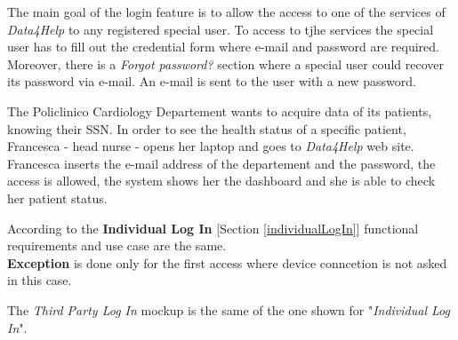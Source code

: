 The main goal of the login feature is to allow the access to one of the services of \textit{Data4Help} to any registered special user. To access to tjhe services the special user has to fill out the credential form where e-mail and password are required. Moreover, there is a \textit{Forgot password?} section where a special user could recover its password via e-mail. An e-mail is sent to the user with a new password.

The Policlinico Cardiology Departement wants to acquire data of its patients, knowing their SSN.
In order to see the health status of a specific patient, Francesca - head nurse - opens her laptop and goes to \textit{Data4Help} web site.
Francesca inserts the e-mail address of the departement and the password, the access is allowed, the system shows her the dashboard and she is able to check her patient status.

According to the \textbf{Individual Log In} [Section \ref{individualLogIn}] functional requirements and use case are the same.\\
\textbf{Exception} is done only for the first access where device conncetion is not asked in this case.

The \textit{Third Party Log In} mockup is the same of the one shown for "\textit{Individual Log In}".
